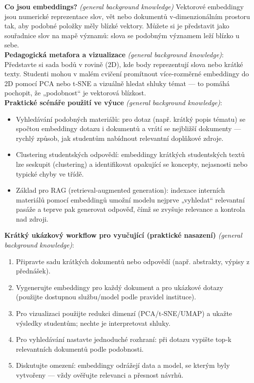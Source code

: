 \noindent\textbf{Co jsou embeddings?} \emph{(general background knowledge)} Vektorové embeddingy jsou numerické reprezentace slov, vět nebo dokumentů v‑dimenzionálním prostoru tak, aby podobné položky měly blízké vektory. Můžete si je představit jako souřadnice slov na mapě významů: slova se podobným významem leží blízko u sebe.\\

\noindent\textbf{Pedagogická metafora a vizualizace} \emph{(general background knowledge)}: Představte si sada bodů v rovině (2D), kde body reprezentují slova nebo krátké texty. Studenti mohou v malém cvičení promítnout více‑rozměrné embeddingy do 2D pomocí PCA nebo t‑SNE a vizuálně hledat shluky témat — to pomáhá pochopit, že „podobnost“ je vektorová blízkost.\\

\noindent\textbf{Praktické scénáře použití ve výuce} \emph{(general background knowledge)}:
\begin{itemize}
  \item Vyhledávání podobných materiálů: pro dotaz (např. krátký popis tématu) se spočtou embeddingy dotazu i dokumentů a vrátí se nejbližší dokumenty — rychlý způsob, jak studentům nabídnout relevantní doplňkové zdroje.
  \item Clustering studentských odpovědí: embeddingy krátkých studentských textů lze seskupit (clustering) a identifikovat opakující se koncepty, nejasnosti nebo typické chyby ve třídě.
  \item Základ pro RAG (retrieval‑augmented generation): indexace interních materiálů pomocí embeddingů umožní modelu nejprve „vyhledat“ relevantní pasáže a teprve pak generovat odpověď, čímž se zvyšuje relevance a kontrola nad zdroji.
\end{itemize}

\noindent\textbf{Krátký ukázkový workflow pro vyučující (praktické nasazení)} \emph{(general background knowledge)}:
\begin{enumerate}
  \item Připravte sadu krátkých dokumentů nebo odpovědí (např. abstrakty, výpisy z přednášek).
  \item Vygenerujte embeddingy pro každý dokument a pro ukázkové dotazy (použijte dostupnou službu/model podle pravidel instituce).
  \item Pro vizualizaci použijte redukci dimenzí (PCA/t‑SNE/UMAP) a ukažte výsledky studentům; nechte je interpretovat shluky.
  \item Pro vyhledávání nastavte jednoduché rozhraní: při dotazu vypište top‑k relevantních dokumentů podle podobnosti.
  \item Diskutujte omezení: embeddingy odrážejí data a model, se kterým byly vytvořeny — vždy ověřujte relevanci a přesnost návrhů.
\end{enumerate}

